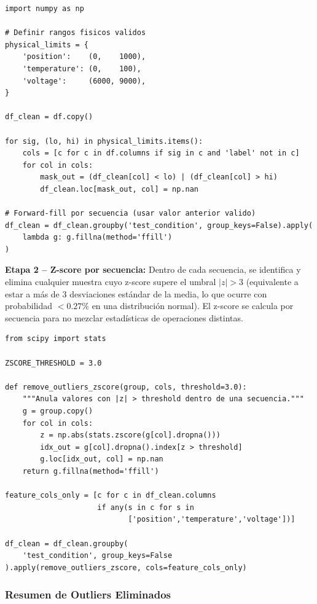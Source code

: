 \documentclass[12pt,a4paper]{article}
\begin{document}
\begin{lstlisting}[caption={Etapa 1: Recorte por rango físico con forward-fill}, label={lst:clip}]
import numpy as np

# Definir rangos fisicos validos
physical_limits = {
    'position':    (0,    1000),
    'temperature': (0,    100),
    'voltage':     (6000, 9000),
}

df_clean = df.copy()

for sig, (lo, hi) in physical_limits.items():
    cols = [c for c in df.columns if sig in c and 'label' not in c]
    for col in cols:
        mask_out = (df_clean[col] < lo) | (df_clean[col] > hi)
        df_clean.loc[mask_out, col] = np.nan

# Forward-fill por secuencia (usar valor anterior valido)
df_clean = df_clean.groupby('test_condition', group_keys=False).apply(
    lambda g: g.fillna(method='ffill')
)
\end{lstlisting}

\textbf{Etapa 2 -- Z-score por secuencia:}
Dentro de cada secuencia, se identifica y elimina cualquier muestra cuyo z-score
supere el umbral $|z| > 3$ (equivalente a estar a más de 3 desviaciones estándar
de la media, lo que ocurre con probabilidad $< 0.27\%$ en una distribución normal).
El z-score se calcula por secuencia para no mezclar estadísticas de operaciones
distintas.

\begin{lstlisting}[caption={Etapa 2: Z-score por secuencia}, label={lst:zscore}]
from scipy import stats

ZSCORE_THRESHOLD = 3.0

def remove_outliers_zscore(group, cols, threshold=3.0):
    """Anula valores con |z| > threshold dentro de una secuencia."""
    g = group.copy()
    for col in cols:
        z = np.abs(stats.zscore(g[col].dropna()))
        idx_out = g[col].dropna().index[z > threshold]
        g.loc[idx_out, col] = np.nan
    return g.fillna(method='ffill')

feature_cols_only = [c for c in df_clean.columns
                     if any(s in c for s in
                            ['position','temperature','voltage'])]

df_clean = df_clean.groupby(
    'test_condition', group_keys=False
).apply(remove_outliers_zscore, cols=feature_cols_only)
\end{lstlisting}

\subsubsection{Resumen de Outliers Eliminados}
\end{document}
